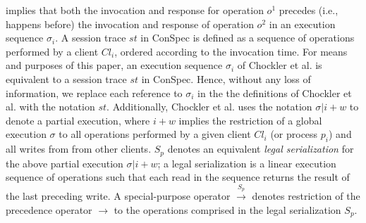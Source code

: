 \documentclass[acmlarge, ,11pt]{acmart}
\begin{document}
  implies that both the invocation and response for operation $\mathit{o}^1$ precedes (i.e., happens before) the invocation and response of operation $\mathit{o}^2$ in an execution sequence $\sigma_i$.  %
   A session trace $\mathit{st}$ in ConSpec is defined as a sequence of operations performed by  a client $\mathit{Cl}_i$, ordered according to the   invocation time.   For means and
   purposes of this paper, an execution sequence $\sigma_i$ of Chockler et al.  is
   equivalent to a session trace $\mathit{st}$ in ConSpec. Hence, without any loss of information,  we replace each reference to $\sigma_i$ in the  the definitions of Chockler et al.  with the notation  $\mathit{st}$.  %
Additionally, Chockler et al. uses the notation $\sigma |i + w$ to denote a partial
    execution, where $i + w$ implies the restriction of a global execution $\sigma$ to all operations performed by a given client $\mathit{Cl}_i$ (or process $p_i$) and all writes from
    from other clients. $S_p$ denotes an equivalent \emph{legal serialization} for the above partial execution $\sigma |i + w$; a legal serialization is a linear execution sequence of operations such that each read in the sequence returns the result of the last preceding write.  A special-purpose operator $\xrightarrow{S_p}$ denotes restriction of the precedence operator $\rightarrow$ to the operations comprised in the legal serialization $S_p$.
\end{document}
